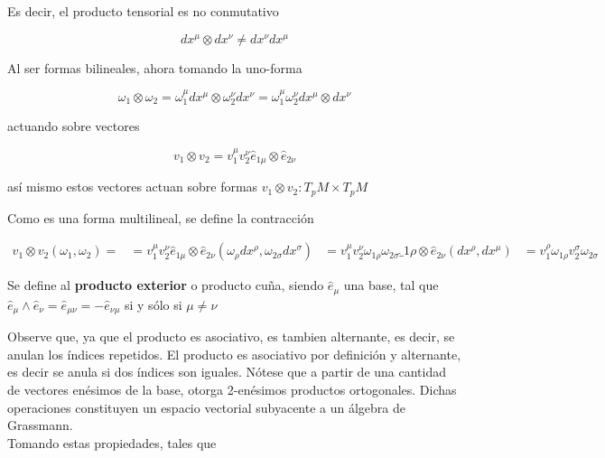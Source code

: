 \documentclass{report}
\begin{document}
{Es decir, el producto tensorial es no conmutativo

\begin{equation}
dx^{\mu} \otimes dx^{\nu }\neq dx ^{\nu} dx ^{\mu}
\end{equation}

Al ser formas bilineales, ahora tomando la uno-forma

\begin{equation}
\omega _1 \otimes \omega _{2} = \omega _1 ^{\mu} dx^{\mu} \otimes \omega_2 ^{\nu} dx^{\nu} = \omega_1 ^{\mu} \omega _2 ^{\nu} dx^{\mu} \otimes dx^{\nu}
\end{equation}

actuando sobre vectores

\begin{equation}
v_{1} \otimes v_{2} = v_{1} ^{\mu} v_{2}^{\nu} \hat{e} _{1\mu} \otimes \hat{e}_{2\nu}
\end{equation}

así mismo estos vectores actuan sobre formas $v_{1} \otimes v_{2} : T_{p}M \times T_{p}M$

Como es una forma multilineal, se define la contracción

\begin{equation}
\begin{split}
v_{1} \otimes v_{2} (\omega _{1} , \omega _{2}) =
& = v_{1} ^{\mu} v_{2} ^{\nu} \hat{e}_{1\mu} \otimes \hat{e}_{2\nu} (\omega _{\rho} dx^{\rho}, \omega _{2 \sigma} dx^{\sigma})
& = v_{1} ^{\mu} v_{2} ^{\nu} \omega _{1 \rho} \omega _{2 \sigma} \hat _{1 \rho} \otimes \hat{e}_{2\nu}(dx^{\rho}, dx^{\mu})
& = v_{1 }^{\rho}\omega _{1\rho} v_{2} ^{\sigma} \omega _{2\sigma}
\end{split}
\end{equation}

Se define al \textbf{producto exterior} o producto cuña, siendo $\hat e_{\mu}$ una base, tal que $\hat e _{\mu} \wedge \hat e_{\nu} = \hat e_{\mu \nu} = - \hat e_{\nu \mu}$ si y sólo si $ \mu \neq \nu $

Observe que, ya que el producto es asociativo, es tambien alternante, es decir, se anulan los índices repetidos. El producto es asociativo por definición y alternante, es decir se anula si dos índices son iguales. Nótese que a partir de una cantidad de vectores enésimos de la base, otorga 2-enésimos productos ortogonales. Dichas operaciones constituyen un espacio vectorial subyacente a un álgebra de Grassmann.\\

Tomando estas propiedades, tales que

}
\end{document}
